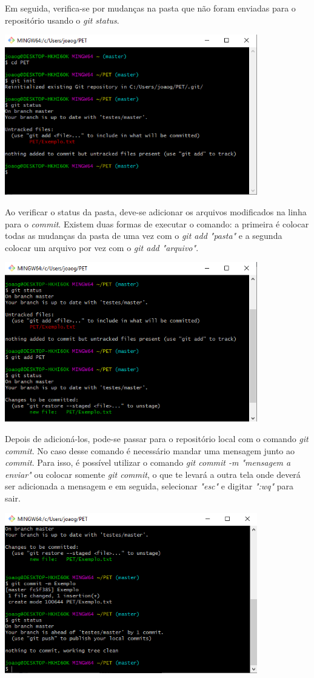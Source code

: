 \documentclass{article}
\begin{document}
Em seguida, verifica-se por mudanças na pasta que não foram enviadas para o repositório usando o \textit{git status}.

\includegraphics[width = 11cm]{images/gitStatus.png}

Ao verificar o status da pasta, deve-se adicionar os arquivos modificados na linha para o \textit{commit}. Existem duas formas de executar o comando: a primeira é colocar todas as mudanças da pasta de uma vez com o \textit{git add "pasta"} e a segunda colocar um arquivo por vez com o \textit{git add "arquivo"}.

\includegraphics[width = 11cm]{images/gitAdd.png}

Depois de adicioná-los, pode-se passar para o repositório local com o comando \textit{git commit}. No caso desse comando é necessário mandar uma mensagem junto ao \textit{commit}. Para isso, é possível utilizar o comando \textit{git commit -m "mensagem a enviar"} ou colocar somente \textit{git commit}, o que te levará a outra tela onde deverá ser adicionada a mensagem e em seguida, selecionar \textit{"esc"} e digitar \textit{":wq"} para sair.

\includegraphics[width = 11cm]{images/gitCommit.png}
\end{document}
